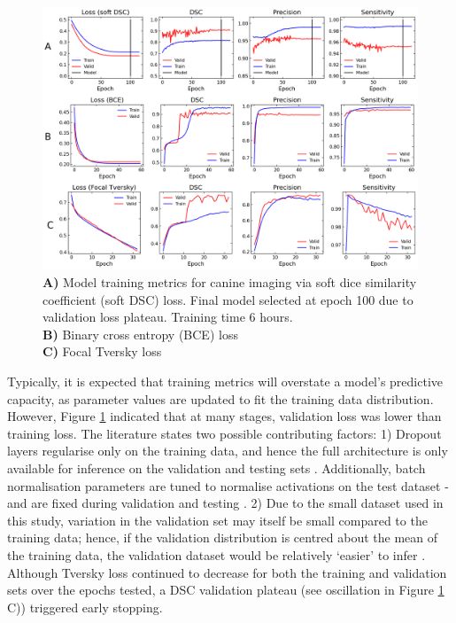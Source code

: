 

\begin{figure}[H]
	\begin{center}
		\hspace*{-1.2cm}\includegraphics[width=1.15\textwidth]{figures/vacbag_metrics_combined}
		\caption{\textbf{A)} Model training metrics for canine imaging via soft dice
      similarity coefficient (soft DSC) loss. Final model selected at epoch 100
      due to validation loss plateau. Training time 6 hours.\\
		\textbf{B)} Binary cross entropy (BCE) loss\\
		\textbf{C)} Focal Tversky loss}
		\label{fig:vet_metrics}
	\end{center}
\end{figure}

Typically, it is expected that training metrics will overstate a model's
predictive capacity, as parameter values are updated to fit the training data
distribution. However, Figure \ref{fig:vet_metrics} indicated that at many
stages, validation loss was lower than training loss. The literature states two
possible contributing factors: 1) Dropout layers regularise only on the training
data, and hence the full architecture is only available for inference on the
validation and testing sets \cite{srivastava2014}. Additionally, batch
normalisation parameters are tuned to normalise activations on the test dataset
- and are fixed during validation and testing \cite{santurkar2018}. 2) Due to
the small dataset used in this study, variation in the validation set may itself
be small compared to the training data; hence, if the validation distribution is
centred about the mean of the training data, the validation dataset would be
relatively `easier' to infer \cite{Bishop}. Although Tversky loss continued to
decrease for both the training and validation sets over the epochs tested, a DSC
validation plateau (see oscillation in Figure \ref{fig:vet_metrics} C))
triggered early stopping.

